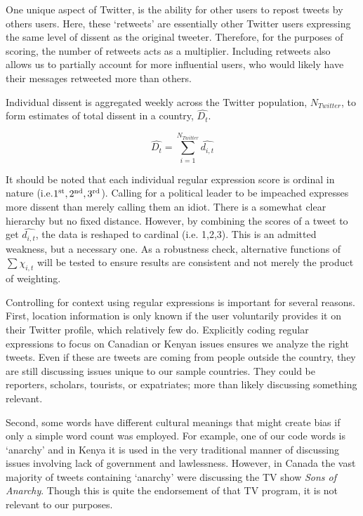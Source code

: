 \documentclass[12pt]{article}
\begin{document}
\begin{spacing}{1.5}
One unique aspect of Twitter, is the ability for other users to repost tweets by others users. Here, these `retweets' are essentially other Twitter users expressing the same level of dissent as the original tweeter. Therefore, for the purposes of scoring, the number of retweets acts as a multiplier. Including retweets also allows us to partially account for more influential users, who would likely have their messages retweeted more than others.     

Individual dissent is aggregated weekly across the Twitter population, $N_{Twitter}$, to form estimates of total dissent in a country, $\hat{D_t}$. 

\vspace{.5 em}
\begin{equation}
\hat{D_t}= \sum_{i=1}^{N_{Twitter}} \hat{d_{i,t}} 	
\end{equation}

It should be noted that each individual regular expression score is ordinal in nature (i.e.$1\textsuperscript{st}, 2\textsuperscript{nd}, 3\textsuperscript{rd}$). Calling for a political leader to be impeached expresses more dissent than merely calling them an idiot. There is a somewhat clear hierarchy but no fixed distance. However, by combining the scores of a tweet to get $\hat{d_{i,t}}$, the data is reshaped to cardinal (i.e. 1,2,3). This is an admitted weakness, but a necessary one. As a robustness check, alternative functions of $\sum \chi_{i,t}$ will be tested to ensure results are consistent and not merely the product of weighting. 



Controlling for context using regular expressions is important for several reasons. First, location information is only known if the user voluntarily provides it on their Twitter profile, which relatively few do. Explicitly coding regular expressions to focus on Canadian or Kenyan issues ensures we analyze the right tweets. Even if these are tweets are coming from people outside the country, they are still discussing issues unique to our sample countries. They could be reporters, scholars, tourists, or expatriates; more than likely discussing something relevant.    

Second, some words have different cultural meanings that might create bias if only a simple word count was employed. For example, one of our code words is `anarchy' and in Kenya it is used in the very traditional manner of discussing issues involving lack of government and lawlessness. However, in Canada the vast majority of tweets containing `anarchy' were discussing the TV show \textit{Sons of Anarchy}. Though this is quite the endorsement of that TV program, it is not relevant to our purposes. 


\end{spacing}
\end{document}
